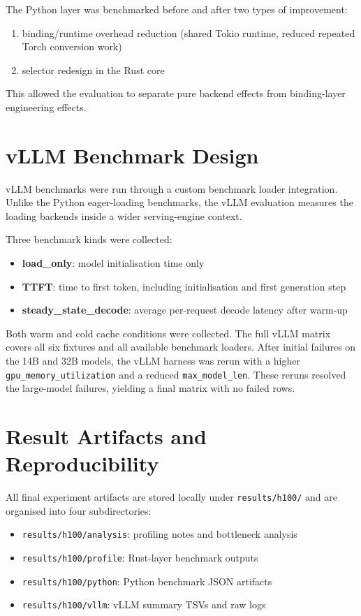 The Python layer was benchmarked before and after two types of improvement:

\begin{enumerate}
\item binding/runtime overhead reduction (shared Tokio runtime, reduced repeated Torch conversion work)
\item selector redesign in the Rust core
\end{enumerate}

This allowed the evaluation to separate pure backend effects from binding-layer engineering effects.

\section{vLLM Benchmark Design}

vLLM benchmarks were run through a custom benchmark loader integration. Unlike the Python eager-loading benchmarks, the vLLM evaluation measures the loading backends inside a wider serving-engine context.

Three benchmark kinds were collected:

\begin{itemize}
\item \textbf{load\_only}: model initialisation time only
\item \textbf{TTFT}: time to first token, including initialisation and first generation step
\item \textbf{steady\_state\_decode}: average per-request decode latency after warm-up
\end{itemize}

Both warm and cold cache conditions were collected. The full vLLM matrix covers all six fixtures and all available benchmark loaders. After initial failures on the 14B and 32B models, the vLLM harness was rerun with a higher \texttt{gpu\_memory\_utilization} and a reduced \texttt{max\_model\_len}. These reruns resolved the large-model failures, yielding a final matrix with no failed rows.

\section{Result Artifacts and Reproducibility}

All final experiment artifacts are stored locally under \texttt{results/h100/} and are organised into four subdirectories:

\begin{itemize}
\item \texttt{results/h100/analysis}: profiling notes and bottleneck analysis
\item \texttt{results/h100/profile}: Rust-layer benchmark outputs
\item \texttt{results/h100/python}: Python benchmark JSON artifacts
\item \texttt{results/h100/vllm}: vLLM summary TSVs and raw logs
\end{itemize}


